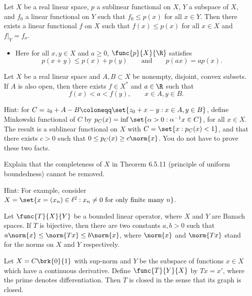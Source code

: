\documentclass[12pt,letterpaper,twoside]{hmcpset}
\begin{document}
\begin{problem}[1]
  Let $X$ be a real linear space, $p$ a sublinear functional on $X$, $Y$ a subspace of $X$, and $f_{0}$ a linear functional on $Y$ such that $f_{0} \leq p(x)$ for all $x \in Y$.
Then there exists a linear functional $f$ on $X$ such that $f(x) \leq p(x)$ for all $x \in X$ and $f|_{Y} = f_{o}$.
\begin{itemize}
\item Here for all $x,y \in X$ and $a \geq 0$, $\func{p}{X}{\R}$ satisfies \[p(x+y) \leq p(x) + p(y) \qquad \text{and} \qquad p(ax) = ap(x).\]
\end{itemize}
\end{problem}

\begin{problem}[2]
  Let $X$ be a real linear space and $A,B \subset X$ be nonempty, disjoint, convex subsets.
  If $A$ is also open, then there exists $f \in X^{*}$ and $a \in \R$ such that \[f(x) < a < f(y), \qquad x \in A, y \in B.\]
  
  Hint: for $C = z_{0} + A - B \coloneqq \set{z_{0} + x - y : x \in A, y \in B}$, define Minkowski functional of $C$ by $p_{C}(x) = \inf \set{\alpha > 0 : \alpha^{-1}x \in C}$, for all $x \in X$.
    The result is a sublinear functional on $X$ with $C = \set{x : p_{C}(x) < 1}$, and that there exists $c > 0$ such that $0 \leq p_{C}(x) \geq c\norm{x}$. 
    You do not have to prove these two facts. 
\end{problem}

\begin{problem}[3]
  Explain that the completeness of $X$ in Theorem 6.5.11 (principle of uniform boundedness) cannot be removed.

  Hint: For example, consider $X = \set{x = (x_{n}) \in \ell^{2} : x_{n} \neq 0 \text{ for only finite many } n}$.
\end{problem}

\begin{problem}[4]
  Let $\func{T}{X}{Y}$ be a bounded linear operator, where $X$ and $Y$ are Banach spaces.  
  If $T$ is bijective, then there are two constants $a,b > 0$ such that $a\norm{x} \leq \norm{Tx} \leq b\norm{x}$, where $\norm{x}$ and $\norm{Tx}$ stand for the norms on $X$ and $Y$ respectively.
\end{problem}

\begin{problem}[5]
  Let $X = C\brk{0}{1}$ with sup-norm and $Y$ be the subspace of functions $x \in X$ which have a continuous derivative.
  Define $\func{T}{Y}{X}$ by $Tx = x'$, where the prime denotes differentiation.
  Then $T$ is closed in the sense that its graph is closed.
\end{problem}
\end{document}
